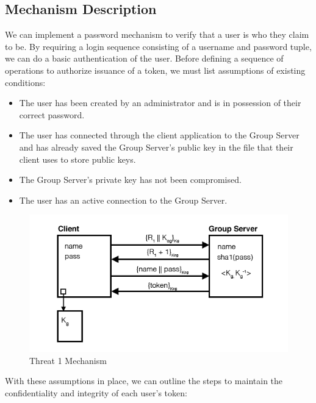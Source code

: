 \documentclass[11pt]{article}
\begin{document}
\subsection{Mechanism Description}
We can implement a password mechanism to verify that a user is who they claim to be. By requiring a login sequence consisting of a username and password tuple, we can do a basic authentication of the user. Before defining a sequence of operations to authorize issuance of a token, we must list assumptions of existing conditions:
\begin{itemize}
\item{}The user has been created by an administrator and is in possession of their correct password.
\item{}The user has connected through the client application to the Group Server and has already saved the Group Server's public key in the file that their client uses to store public keys.
\item{}The Group Server's private key has not been compromised.
\item{}The user has an active connection to the Group Server.
\end{itemize}
\begin{figure}[htbp]
\begin{center}
\includegraphics{threat1}
\caption{Threat 1 Mechanism}
\label{threat1}
\end{center}
\end{figure}
With these assumptions in place, we can outline the steps to maintain the confidentiality and integrity of each user's token:
\end{document}
